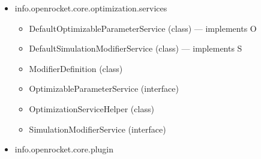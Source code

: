 \documentclass{amsdtx}
\begin{document}
\begin{itemize}
\begin{itemize}
    \begin{itemize}
    
    \item
      DeploymentVelocityParameter (class) --- extends S
    \item
      GroundHitVelocityParameter (class) --- extends S
    \item
      LandingDistanceParameter (class) --- extends S
    \item
      MaximumAccelerationParameter (class) --- extends S
    \item
      MaximumAltitudeParameter (class) --- extends S
    \item
      MaximumVelocityParameter (class) --- extends S
    \item
      SimulationBasedParameter (class) --- implements O
    \item
      StabilityParameter (class) --- implements O
    \item
      TotalFlightTimeParameter (class) --- extends S
    \item
      must (class)
    \end{itemize}
  \item
    info.openrocket.core.optimization.services

    \begin{itemize}
    
    \item
      DefaultOptimizableParameterService (class) --- implements O
    \item
      DefaultSimulationModifierService (class) --- implements S
    \item
      ModifierDefinition (class)
    \item
      OptimizableParameterService (interface)
    \item
      OptimizationServiceHelper (class)
    \item
      SimulationModifierService (interface)
    \end{itemize}
  \item
    info.openrocket.core.plugin

    \begin{itemize}
    

\end{itemize}
\end{itemize}
\end{itemize}
\end{document}
